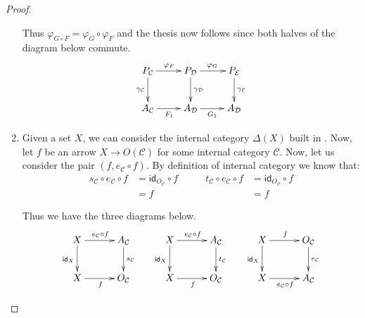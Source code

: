 \documentclass[a4paper,UKenglish,cleveref,pdftex,thm-restate,numberwithinsect]{lipics-v2021}
\newcommand{\id}[1]{\mathsf{id}_{#1}}
\begin{document}
\begin{proof}
\begin{enumerate}
		Thus $\varphi_{G\circ F}=\varphi_{G}\circ \varphi_F$ and the thesis now follows since both halves of the diagram below commute.
			\[\xymatrix{P_{\mathcal{C}} \ar[d]_{\gamma_{\mathcal{C}}}\ar[r]^{\varphi_F} & P_{\mathcal{D}} \ar[d]^{\gamma_{\mathcal{D}}}  \ar[r]^{\varphi_G} & P_{\mathcal{E}} \ar[d]^{\gamma_{\mathcal{E}}}\\ A_{\mathcal{C}} \ar[r]_{F_1} & A_{\mathcal{D}}  \ar[r]_{G_1} & A_{\mathcal{D}}}\]
	\item  Given a set $X$, we can consider the internal category $\Delta(X)$ built in . Now, let $f$ be an arrow $X\to O(\mathcal{C})$ for some internal category $\mathcal{C}$.  Now, let us consider the pair $(f, e_{\mathcal{C}}\circ f)$. By definition of internal category we know that:
	\[\begin{split}
		s_{\mathcal{C}}\circ e_{\mathcal{C}}\circ f & = \id{O_{\mathcal{C}}}\circ f \\&= f
	\end{split} \qquad \begin{split}
	t_{\mathcal{C}}\circ e_{\mathcal{C}}\circ f & = \id{O_{\mathcal{C}}}\circ f \\&= f
	\end{split}\]
	
	Thus we have the three diagrams below.
		\[\xymatrix@C=30pt{X \ar[r]^{e_{\mathcal{C}}\circ f}  \ar[d]_{\id{X}}& A_{\mathcal{C}} \ar[d]^{s_{\mathcal{C}}}& X \ar[d]_{\id{X}} \ar[r]^{e_{\mathcal{C}}\circ f} & A_{\mathcal{C}} \ar[d]^{t_{\mathcal{C}}} &  X \ar[d]_{\id{X}} \ar[r]^{f}& O_{\mathcal{C}} \ar[d]^{e_{\mathcal{C}}}\\ X \ar[r]_{f} & O_{\mathcal{C}} & X \ar[r]_{f} & O_{\mathcal{C}} & X \ar[r]_{e_{\mathcal{C}}\circ f} & A_{\mathcal{C}}}\]
	

\end{enumerate}
\end{proof}
\end{document}
